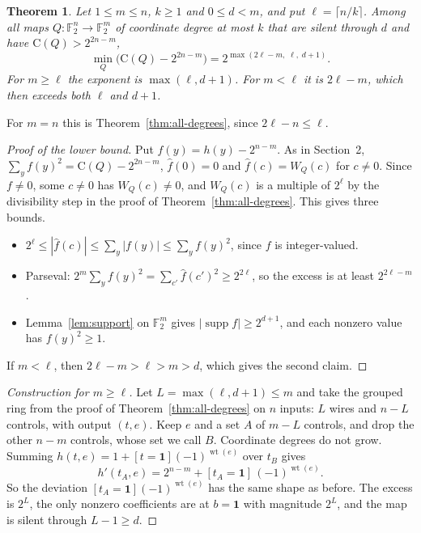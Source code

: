 \documentclass[11pt]{article}
\newtheorem{theorem}{Theorem}
\theoremstyle{definition}
\theoremstyle{remark}
\newcommand{\F}{\mathbb{F}_2}
\newcommand{\wt}{\operatorname{wt}}
\newcommand{\W}{W}
\newcommand{\Coll}{\mathrm{C}}
\newcommand{\one}{\mathbf{1}}
\begin{document}
\begin{theorem}\label{thm:rect}
Let $1\le m\le n$, $k\ge1$ and $0\le d<m$, and put $\ell=\lceil n/k\rceil$.
Among all maps $Q\colon\F^n\to\F^m$ of coordinate degree at most $k$ that are
silent through $d$ and have $\Coll(Q)>2^{2n-m}$,
\[
  \min_Q\bigl(\Coll(Q)-2^{2n-m}\bigr)=2^{\max(2\ell-m,\;\ell,\;d+1)} .
\]
For $m\ge\ell$ the exponent is $\max(\ell,d+1)$. For $m<\ell$ it is $2\ell-m$,
which then exceeds both $\ell$ and $d+1$.
\end{theorem}

For $m=n$ this is Theorem~\ref{thm:all-degrees}, since $2\ell-n\le\ell$.

\begin{proof}[Proof of the lower bound]
Put $f(y)=h(y)-2^{n-m}$. As in Section~2,
$\sum_yf(y)^2=\Coll(Q)-2^{2n-m}$, $\hat f(0)=0$ and $\hat f(c)=\W_Q(c)$ for
$c\ne0$. Since $f\ne0$, some $c\ne0$ has $\W_Q(c)\ne0$, and $\W_Q(c)$ is a
multiple of $2^\ell$ by the divisibility step in the proof of
Theorem~\ref{thm:all-degrees}. This gives three bounds.
\begin{itemize}
\item $2^\ell\le|\hat f(c)|\le\sum_y|f(y)|\le\sum_yf(y)^2$, since $f$ is
  integer-valued.
\item Parseval: $2^m\sum_yf(y)^2=\sum_{c'}\hat f(c')^2\ge2^{2\ell}$, so the
  excess is at least $2^{2\ell-m}$.
\item Lemma~\ref{lem:support} on $\F^m$ gives
  $|\operatorname{supp}f|\ge2^{d+1}$, and each nonzero value has $f(y)^2\ge1$.
\end{itemize}
If $m<\ell$, then $2\ell-m>\ell>m>d$, which gives the second claim.
\end{proof}

\begin{proof}[Construction for $m\ge\ell$]
Let $L=\max(\ell,d+1)\le m$ and take the grouped ring from the proof of
Theorem~\ref{thm:all-degrees} on $n$ inputs: $L$ wires and $n-L$ controls,
with output $(t,e)$. Keep $e$ and a set $A$ of $m-L$ controls, and drop the
other $n-m$ controls, whose set we call $B$. Coordinate degrees do not grow.
Summing $h(t,e)=1+[t=\one](-1)^{\wt(e)}$ over $t_B$ gives
\[
  h'(t_A,e)=2^{n-m}+[t_A=\one]\,(-1)^{\wt(e)} .
\]
So the deviation $[t_A=\one](-1)^{\wt(e)}$ has the same shape as before. The
excess is $2^L$, the only nonzero coefficients are at $b=\one$ with
magnitude $2^L$, and the map is silent through $L-1\ge d$.
\end{proof}
\end{document}
